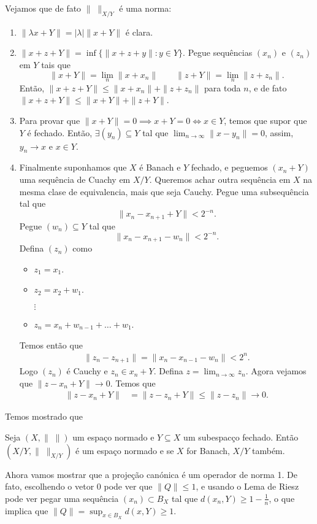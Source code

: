 \documentclass[portuguese]{article}
\theoremstyle{definition}
\begin{document}
	Vejamos que de fato $\|\;\|_{X/Y}$ é uma norma:
	\begin{enumerate}
		\item $\| \lambda x+Y\|=|\lambda|\| x+Y\|$ é clara.
		\item $\| x+z+Y\|=\inf\{\| x+z+y\|:y\in Y\}$. Pegue sequências $(x_n)$ e $(z_n)$ em $Y$ tais que 
		\[\| x+Y\|=\lim_n\| x+x_n\|\qquad\| z+Y\|=\lim_n\| z+z_n\|.\]
		Então, $\| x+z+Y\|\leq\| x+x_n\|+\| z+z_n\|$ para toda $n$, e de fato $\| x+z+Y\|\leq\| x+Y\|+\| z+Y\|$.
		
		\item Para provar que $\| x+Y\|=0\implies x+Y=0\iff x\in Y$, temos que supor que $Y$ é fechado. Então, $\exists (y_n)\subseteq Y$ tal que $\lim_{n\to\infty}\| x-y_n\|=0$, assim, $y_n\to x$ e $x\in Y$.
		
		\item Finalmente suponhamos que $X$ é Banach e $Y$ fechado, e peguemos $(x_n+Y)$ uma sequência de Cuachy em $X/Y$. Queremos achar outra sequência em $X$ na mesma clase de equivalencia, mais que seja Cauchy. Pegue uma subsequência tal que
		\[\| x_n-x_{n+1}+Y\|<2^{-n}.\]
		Pegue $(w_n)\subseteq Y$ tal que
		\[\| x_n-x_{n+1}-w_n\|<2^{-n}.\]
		Defina $(z_n)$ como
		\begin{itemize}
			\item $z_1=x_1$.
			\item $z_2=x_2+w_1$.
			
			$\vdots$
			\item $z_n=x_n+w_{n-1}+\ldots+w_1$.
		\end{itemize}
		Temos então que
		\begin{align*}
			\| z_n-z_{n+1}\|=\| x_n-x_{n-1}-w_n\|<2^{n}.
		\end{align*}
		Logo $(z_n)$ é Cauchy e $z_n\in x_n+Y$. Defina $z=\lim_{n\to\infty}z_n$. Agora vejamos que $\| z-x_n+Y\|\to0$. Temos que
		\begin{align*}
			\| z-x_n+Y\|&=\| z-z_n+Y\|\leq \| z-z_n\|\to0.
		\end{align*}
	\end{enumerate}
	Temos mostrado que
	\begin{teo}
		Seja $(X,\|\;\|)$ um espaço normado e $Y\subseteq X$ um subespacço fechado. Então $(X/Y,\|\;\|_{X/Y})$ é um espaço normado e se $X$ for Banach, $X/Y$ também.
	\end{teo}
	Ahora vamos mostrar que a projeção canónica é um operador de norma 1. De fato, escolhendo o vetor 0 pode ver que $\| Q\|\leq1$, e usando o Lema de Riesz pode ver pegar uma sequência $(x_n)\subset B_X$ tal que $d(x_n,Y)\geq1-\frac{1}{n}$, o que implica que $\| Q\|=\sup_{x\in B_X}d(x,Y)\geq1$.
\end{document}
